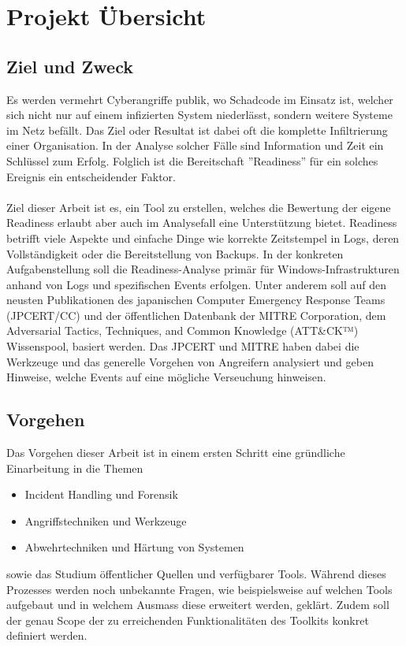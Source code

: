 \section{Projekt Übersicht}

\subsection{Ziel und Zweck}
Es werden vermehrt Cyberangriffe publik, wo Schadcode im Einsatz ist, welcher sich nicht nur auf einem infizierten System niederlässt, sondern weitere Systeme im Netz befällt. Das Ziel oder Resultat ist dabei oft die komplette Infiltrierung einer Organisation. In der Analyse solcher Fälle sind Information und Zeit ein Schlüssel zum Erfolg. Folglich ist die Bereitschaft ''Readiness'' für ein solches Ereignis ein entscheidender Faktor.
\\\\
Ziel dieser Arbeit ist es, ein Tool zu erstellen, welches die Bewertung der eigene Readiness erlaubt aber auch im Analysefall eine Unterstützung bietet. Readiness betrifft viele Aspekte und einfache Dinge wie korrekte Zeitstempel in Logs, deren Vollständigkeit oder die Bereitstellung von Backups. In der konkreten Aufgabenstellung soll die Readiness-Analyse primär für Windows-Infrastrukturen anhand von Logs und spezifischen Events erfolgen. Unter anderem soll auf den neusten Publikationen des japanischen Computer Emergency Response Teams (JPCERT/CC) und der öffentlichen Datenbank der MITRE Corporation, dem Adversarial Tactics, Techniques, and Common Knowledge (ATT\&CK™) Wissenspool, basiert werden. Das JPCERT und MITRE haben dabei die Werkzeuge und das generelle Vorgehen von Angreifern analysiert und geben Hinweise, welche Events auf eine mögliche Verseuchung hinweisen.

\subsection{Vorgehen}
Das Vorgehen dieser Arbeit ist in einem ersten Schritt eine gründliche Einarbeitung in die Themen
\begin{itemize}
    \item Incident Handling und Forensik
    \item Angriffstechniken und Werkzeuge
    \item Abwehrtechniken und Härtung von Systemen
\end{itemize}
sowie das Studium öffentlicher Quellen und verfügbarer Tools. Während dieses Prozesses werden noch unbekannte Fragen, wie beispielsweise auf welchen Tools aufgebaut und in welchem Ausmass diese erweitert werden, geklärt. Zudem soll der genau Scope der zu erreichenden Funktionalitäten des Toolkits konkret definiert werden.


